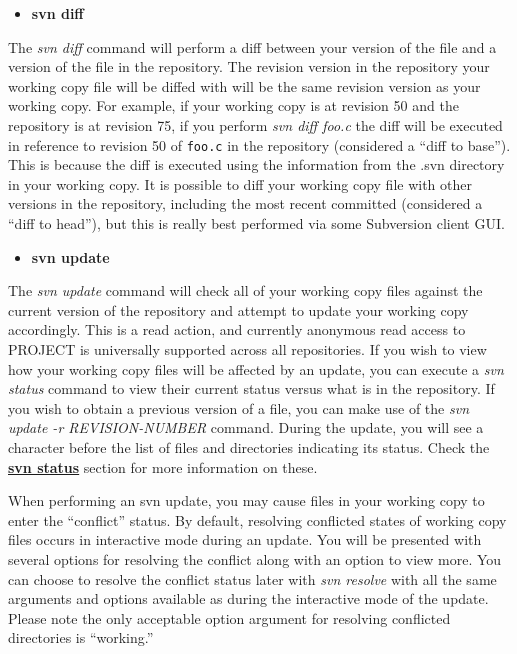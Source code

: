 \documentclass[12pt,letterpaper]{article}
\begin{document}
\begin{itemize}
\item \textbf{svn diff}
\end{itemize}

The \emph{svn diff} command will perform a diff between your version of the file and a version of the file in the repository.  The revision version in the repository your working copy file will be diffed with will be the same revision version as your working copy.  For example, if your working copy is at revision 50 and the repository is at revision 75, if you perform \emph{svn diff foo.c} the diff will be executed in reference to revision 50 of \verb|foo.c| in the repository (considered a ``diff to base'').  This is because the diff is executed using the information from the .svn directory in your working copy.  It is possible to diff your working copy file with other versions in the repository, including the most recent committed (considered a ``diff to head''), but this is really best performed via some Subversion client GUI.

\begin{itemize}
\item \textbf{svn update}
\end{itemize}

The \emph{svn update} command will check all of your working copy files against the current version of the repository and attempt to update your working copy accordingly.  This is a read action, and currently anonymous read access to PROJECT is universally supported across all repositories.  If you wish to view how your working copy files will be affected by an update, you can execute a \emph{svn status} command to view their current status versus what is in the repository.  If you wish to obtain a previous version of a file, you can make use of the \emph{svn update -r REVISION-NUMBER} command.  During the update, you will see a character before the list of files and directories indicating its status.  Check the \hyperlink{svnstatus}{\textbf{svn status}} section for more information on these.

When performing an svn update, you may cause files in your working copy to enter the ``conflict'' status.  By default, resolving conflicted states of working copy files occurs in interactive mode during an update.  You will be presented with several options for resolving the conflict along with an option to view more.  You can choose to resolve the conflict status later with \emph{svn resolve} with all the same arguments and options available as during the interactive mode of the update.  Please note the only acceptable option argument for resolving conflicted directories is ``working.''
\end{document}
